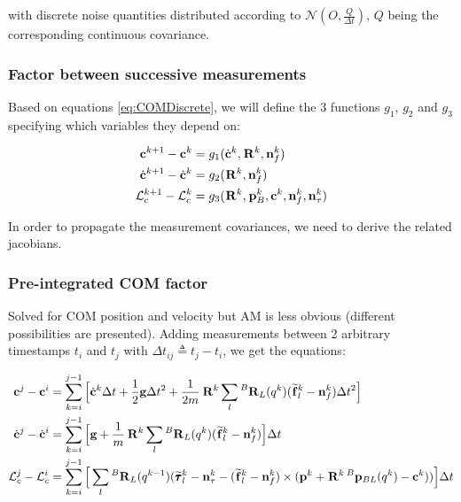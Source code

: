 \documentclass[11pt]{article}
\newcommand{\Rot}[2]{\prescript{#1}{}{\bfR}_{#2}}
\newcommand{\noise}{\bfn}
\newcommand{\posi}[2]{\prescript{#1}{}{\bfp}_{#2}}
\newcommand{\forcem}[2]{\prescript{#1}{}{\widetilde{\bff}}_{#2}}
\newcommand{\torquem}[2]{\prescript{#1}{}{\widetilde{\pmb{\tau}}}_{#2}}
\newcommand{\AM}{\mathcal{L}}
\newcommand{\COM}{\bfc}
\begin{document}
with discrete noise quantities distributed according to \( \mathcal{N}(O,\frac{Q}{\Delta t}) \), \(Q\) being the corresponding continuous covariance.


\subsubsection{Factor between successive measurements}
Based on equations \ref{eq:COMDiscrete}, we will define the 3 functions \(g_1\), \(g_2\) and \(g_3\) specifying which variables they depend on:

\begin{equation}
\begin{split}
\COM^{k+1} - \COM^{k} &=  g_1(\dot{\COM}^{k}, \Rot{}{}^{k}, \noise_f^{k})
\\
\dot{\COM}^{k+1} - \dot{\COM}^{k} &= g_2(\Rot{}{}^{k}, \noise_f^{k}) 
\\
\AM_c^{k+1} - \AM_c^{k} &= g_3(\Rot{}{}^{k}, \posi{}{B}^{k}, \COM^{k}, \noise_f^{k}, \noise_\tau^{k})
\end{split}
\end{equation}

In order to propagate the measurement covariances, we need to derive the related jacobians.

\subsubsection{Pre-integrated COM factor}
Solved for COM position and velocity but AM is less obvious (different possibilities are presented). Adding measurements between 2 arbitrary timestamps \(t_i\) and \(t_j\) with \(\Delta t_{ij} \triangleq t_j - t_i\), we get the equations:

\begin{equation}
\begin{split}
\COM^{j} - \COM^{i} &= \sum_{k=i}^{j-1} \Big[ 
\dot{\COM}^{k} \Delta t 
+ \dfrac{1}{2}\bfg \Delta t^2 + \frac{1}{2m} \Rot{}{}^{k} \sum_l \Rot{B}{L}(q^{k}) (\forcem{}{l}^{k} - \noise_f^{k})\Delta t^2 \Big]
\\
\dot{\COM}^{j} - \dot{\COM}^{i} &= \sum_{k=i}^{j-1} \Big[ 
\bfg + \frac{1}{m} \Rot{}{}^{k} \sum_l \Rot{B}{L}(q^{k}) (\forcem{}{l}^{k} - \noise_f^{k}) \Big] \Delta t 
\\
\AM_c^{j} - \AM_c^{i} &=  \sum_{k=i}^{j-1} \Big[ 
\sum_l \Rot{B}{L}(q^{k-1}) (\torquem{}{l}^{k} - \noise_{\tau}^{k} - (\forcem{}{l}^{k} - \noise_f^{k}) \times (\bfp^{k} + \Rot{}{}^{k}\posi{B}{BL}(q^{k}) - \COM^{k})) \Big]  \Delta t
\end{split}
\label{eq:COMij}
\end{equation}
\end{document}
